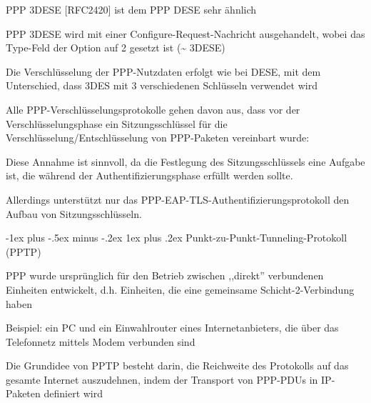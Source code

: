 \documentclass[a4paper]{article}
\makeatletter
\renewcommand{\subsubsection}{\@startsection{subsubsection}{3}{0mm}%
 {-1ex plus -.5ex minus -.2ex}%
 {1ex plus .2ex}%
 {\normalfont\small\bfseries}}
\makeatother
\begin{document}
\begin{multicols}{3}
\begin{itemize*}
            \begin{itemize*}
                  \item PPP 3DESE {[}RFC2420{]} ist dem PPP DESE sehr ähnlich
                  \item PPP 3DESE wird mit einer Configure-Request-Nachricht ausgehandelt, wobei das Type-Feld der Option auf 2 gesetzt ist (\textasciitilde{} 3DESE)
                  \item Die Verschlüsselung der PPP-Nutzdaten erfolgt wie bei DESE, mit dem Unterschied, dass 3DES mit 3 verschiedenen Schlüsseln verwendet wird
            \end{itemize*}
            \item
            Alle PPP-Verschlüsselungsprotokolle gehen davon aus, dass vor der
            Verschlüsselungsphase ein Sitzungsschlüssel für die
            Verschlüsselung/Entschlüsselung von PPP-Paketen vereinbart wurde:

            \begin{itemize*}
                  \item Diese Annahme ist sinnvoll, da die Festlegung des Sitzungsschlüssels eine Aufgabe ist, die während der Authentifizierungsphase erfüllt werden sollte.
                  \item Allerdings unterstützt nur das PPP-EAP-TLS-Authentifizierungsprotokoll den Aufbau von Sitzungsschlüsseln.
            \end{itemize*}
      \end{itemize*}


      \subsubsection{Punkt-zu-Punkt-Tunneling-Protokoll
            (PPTP)}

      \begin{itemize*}
            \item
            PPP wurde ursprünglich für den Betrieb zwischen ,,direkt'' verbundenen
            Einheiten entwickelt, d.h. Einheiten, die eine gemeinsame
            Schicht-2-Verbindung haben

            \begin{itemize*}
                  \item Beispiel: ein PC und ein Einwahlrouter eines Internetanbieters, die über das Telefonnetz mittels Modem verbunden sind
            \end{itemize*}
            \item
            Die Grundidee von PPTP besteht darin, die Reichweite des Protokolls
            auf das gesamte Internet auszudehnen, indem der Transport von PPP-PDUs
            in IP-Paketen definiert wird


\end{itemize*}
\end{multicols}
\end{document}

